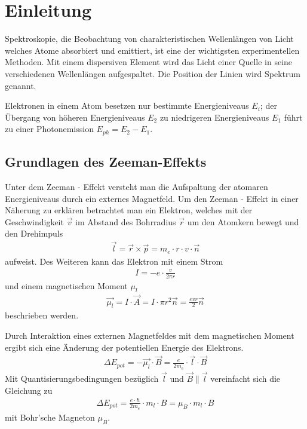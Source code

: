 \section{Einleitung}

  Spektroskopie, die Beobachtung von charakteristischen Wellenlängen von Licht welches Atome absorbiert und emittiert, ist eine der wichtigsten experimentellen Methoden. Mit einem dispersiven Element wird das Licht einer Quelle in seine verschiedenen Wellenlängen aufgespaltet. Die Position der Linien wird Spektrum genannt.

  Elektronen in einem Atom besetzen nur bestimmte Energieniveaus $E_i$; der Übergang von höheren Energieniveaus $E_2$ zu niedrigeren Energieniveaus $E_1$ führt zu einer Photonemission $E_{ph} = E_2 - E_1$.

  \subsection{Grundlagen des Zeeman-Effekts}
    Unter dem Zeeman - Effekt versteht man die Aufspaltung der atomaren Energieniveaus durch ein externes Magnetfeld. Um den Zeeman - Effekt in einer Näherung zu erklären betrachtet man ein Elektron, welches mit der Geschwindigkeit $\vec{v}$ im Abstand des Bohrradius $\vec{r}$ um den Atomkern bewegt und den Drehimpuls
    \begin{align}
    	\vec{l} = \vec{r} \times \vec{p} = m_e \cdot r \cdot v \cdot \vec{n}
    \end{align}
    aufweist. Des Weiteren kann das Elektron mit einem Strom
    \begin{align}
    	I = -e \cdot \frac{v}{2 \pi r}
    \end{align}
    und einem magnetischen Moment $\mu_l$
    \begin{align}
    	\vec{\mu_l} = I \cdot \vec{A} = I \cdot \pi r^2 \vec{n} = \frac{evr}{2}\vec{n}
    \end{align}
    beschrieben werden.

    Durch Interaktion eines externen Magnetfeldes mit dem magnetischen Moment ergibt sich eine Änderung der potentiellen Energie des Elektrons.
    \begin{align}
    	\Delta E_{pot} = - \vec{\mu_l} \cdot \vec{B} = \frac{e}{2m_e} \cdot \vec{l} \cdot \vec{B}
    \end{align}
    Mit Quantisierungsbedingungen bezüglich $\vec{l}$ und $\vec{B} \parallel \vec{l}$ vereinfacht sich die Gleichung zu
    \begin{align}
    	\Delta E_{pot} = \frac{e \cdot \hbar}{2m_e} \cdot m_l \cdot B = \mu_B \cdot m_l \cdot B
    \end{align}
    mit Bohr'sche Magneton $\mu_B$.

